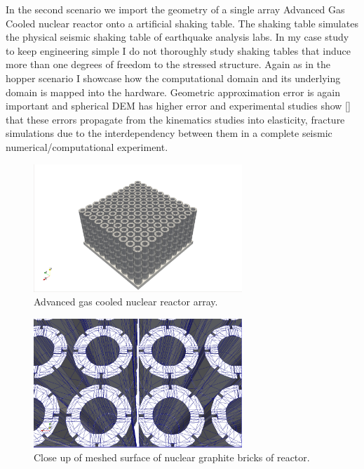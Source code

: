 \documentclass[times,12pt]{article}
\begin{document}
In the second scenario we import the geometry of a single array Advanced Gas Cooled nuclear reactor onto a artificial shaking table. The shaking table simulates the physical seismic shaking table of earthquake analysis labs. In my case study to keep engineering simple I do not thoroughly study shaking tables that induce more than one degrees of freedom to the stressed structure. Again as in the hopper scenario I showcase how the computational domain and its underlying domain is 
mapped into the hardware. Geometric approximation error is again important and spherical DEM has higher error and experimental studies show [] that these errors propagate from the kinematics studies into elasticity, fracture simulations due to the interdependency between them in a complete seismic numerical/computational experiment.

\begin{figure}[!h]
\centering
\includegraphics[width=0.7\textwidth]{sketches/nuclear} \protect\caption{\label{nuclear}Advanced gas cooled nuclear reactor array.}
\end{figure}

\begin{figure}[!h]
\centering
\includegraphics[width=0.7\textwidth]{sketches/nuclearcloseup} \protect\caption{\label{nuclearcloseup}Close up of meshed surface of nuclear graphite bricks of reactor.}
\end{figure}
\end{document}
